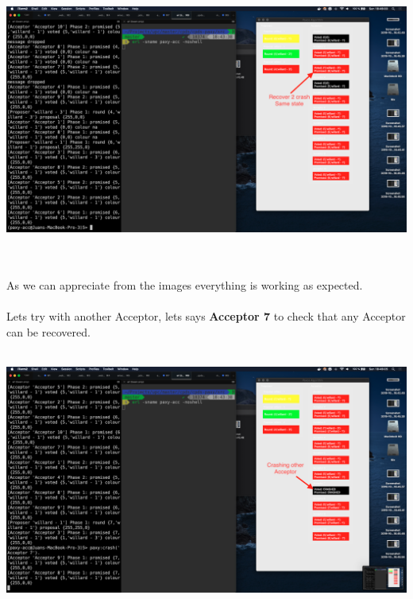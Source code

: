 \documentclass[a4paper, 10pt]{article}
\begin{document}
\begin{minipage}[t]{\linewidth}
  \centering
  \includegraphics[width=\textwidth]{2recover_acc3}
\end{minipage}\\\\

As we can appreciate from the images everything is working as expected.\\\\
Lets try with another Acceptor, lets says \textbf{Acceptor 7} to check that any
Acceptor can be recovered.\\\\

\begin{minipage}[t]{\linewidth}
  \centering
  \includegraphics[width=\textwidth]{other_crash}
\end{minipage}\\\\
\end{document}
